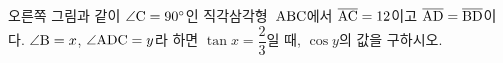 \noindent\begin{minipage}[t]{0.58\linewidth}\vspace{0pt}\raggedright 오른쪽 그림과 같이 $\angle\mathrm{C}=90^\circ$인 직각삼각형~$\mathrm{ABC}$에서 $\overline{\mathrm{AC}}=12$이고 $\overline{\mathrm{AD}}=\overline{\mathrm{BD}}$이다. $\angle\mathrm{B}=x$, $\angle\mathrm{ADC}=y$라 하면 $\tan x=\dfrac{2}{3}$일 때, $\cos y$의 값을 구하시오.\end{minipage}\hfill\begin{minipage}[t]{0.4\linewidth}\vspace{0pt}\centering \resizebox{\ifdim\width>\linewidth\linewidth\else\width\fi}{!}{}\end{minipage}\par
